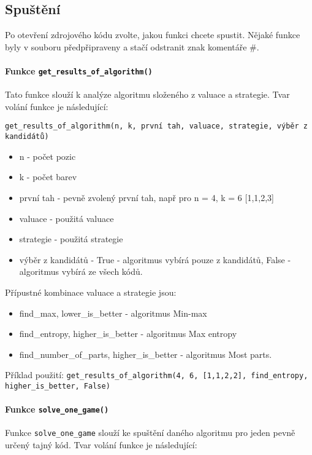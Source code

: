 \documentclass[12pt,a4paper]{article}
\begin{document}
\subsection{Spuštění}

Po otevření zdrojového kódu zvolte, jakou funkci chcete spustit. Nějaké funkce byly v souboru předpřipraveny a stačí odstranit znak komentáře \#. 
\paragraph{Funkce \texttt{get\_results\_of\_algorithm()}}
Tato funkce slouží k analýze algoritmu složeného z valuace a strategie. Tvar volání funkce je následující:

\texttt{get\_results\_of\_algorithm(n, k, první tah, valuace, strategie, výběr z kandidátů)}
\begin{itemize}
    \item n - počet pozic
    \item k - počet barev
    \item první tah - pevně zvolený první tah, např pro n = 4, k = 6 [1,1,2,3]
    \item valuace - použitá valuace
    \item strategie - použitá strategie
    \item výběr z kandidátů - True - algoritmus vybírá pouze z kandidátů, 
        False - algoritmus vybírá ze všech kódů.
\end{itemize}


Přípustné kombinace valuace a strategie jsou:
\begin{itemize}
    \item find\_max, lower\_is\_better - algoritmus Min-max
    \item find\_entropy, higher\_is\_better - algoritmus Max entropy
    \item find\_number\_of\_parts, higher\_is\_better - algoritmus Most parts.
\end{itemize}
Příklad použití:
\texttt{get\_results\_of\_algorithm(4, 6, [1,1,2,2], find\_entropy, higher\_is\_better, False)}

\paragraph{Funkce \texttt{solve\_one\_game()}}
Funkce \texttt{solve\_one\_game} slouží ke spuštění daného algoritmu pro jeden pevně určený tajný kód. Tvar volání funkce je následující:
\end{document}
